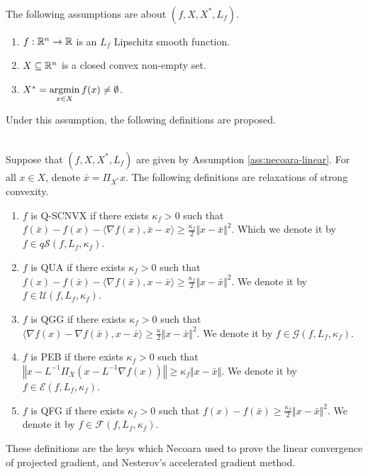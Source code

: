 \documentclass[12pt]{article}
\begin{document}
    \begin{assumption}\; \label{ass:necoara-linear} \\
        The following assumptions are about $(f, X, X^*, L_f)$. 
        \begin{enumerate}[nosep]
            \item $f: \mathbb R^n \rightarrow \mathbb R$ is an $L_f$ Lipschitz smooth function. 
            \item $X \subseteq \mathbb R^n$ is a closed convex non-empty set. 
            \item $X^* = \mathop{\rm argmin}\limits_{x \in X} f(x) \neq \emptyset$. 
        \end{enumerate}
    \end{assumption}
    Under this assumption, the following definitions are proposed. 
    \newcommand{\QSCNVX}{\ensuremath{q\mathcal{S}}}
    \newcommand{\QUA}{\ensuremath{\mathcal U}}
    \newcommand{\QGG}{\ensuremath{\mathcal G}}
    \newcommand{\QFG}{\ensuremath{\mathcal F}} 
    \newcommand{\PEB}{\ensuremath{\mathcal E}}
    \begin{definition}\; \\
        Suppose that $(f, X, X^*, L_f)$ are given by Assumption \ref{ass:necoara-linear}. 
        For all $x \in X$, denote $\bar x = \Pi_{X^*}x$. 
        The following definitions are relaxations of strong convexity. 
        \begin{enumerate}[nosep]
            \item $f$ is Q-SCNVX if there exists $\kappa_f > 0$ such that $f(\bar x) - f(x) - \langle \nabla f(x), \bar x - x\rangle \ge \frac{\kappa_f}{2}\Vert x - \bar x\Vert^2$. 
            Which we denote it by $f \in \QSCNVX(f, L_f, \kappa_f)$. 
            \item $f$ is QUA if there exists $\kappa_f > 0$ such that $f(x) - f(\bar x) - \langle \nabla f(\bar x), x - \bar x\rangle \ge \frac{\kappa_f}{2}\Vert x -\bar x\Vert^2$. 
            We denote it by $f \in \QUA(f, L_f, \kappa_f)$.
            \item $f$ is QGG if there exists $\kappa_f > 0$ such that $\langle \nabla f(x) - \nabla f(\bar x), x - \bar x\rangle \ge \frac{\kappa}{2}\Vert x - \bar x\Vert^2$. 
            We denote it by $f \in \QGG(f, L_f, \kappa_f)$. 
            \item $f$ is PEB if there exists $\kappa_f > 0$ such that $\left\Vert x - L^{-1}\Pi_X(x - L^{-1}\nabla f(x))\right\Vert \ge \kappa_f\Vert x - \bar x\Vert$. 
            We denote it by $f \in \PEB(f, L_f, \kappa_f)$. 
            \item $f$ is QFG if there exists $\kappa_f > 0$ such that $f(x) - f(\bar x) \ge \frac{\kappa_f}{2}\Vert x - \bar x\Vert^2$. 
            We denote it by $f \in \QFG(f, L_f, \kappa_f)$. 
        \end{enumerate}
    \end{definition}
    These definitions are the keys which Necoara used to prove the linear convergence of projected gradient, and Nesterov's accelerated gradient method. 
\end{document}
